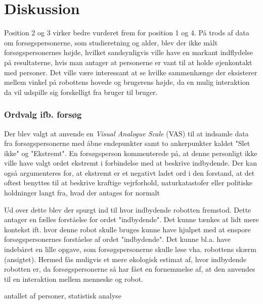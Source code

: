 \section*{Diskussion}
\label{Discussion}

Position 2 og 3 virker bedre vurderet frem for position 1 og 4. På trods af data om forsøgspersonerne, som studieretning og alder, blev der ikke målt forsøgspersonernes højde, hvilket sandsynligvis ville have en markant indflydelse på resultaterne, hvis man antager at personerne er vant til at holde øjenkontakt med personer. Det ville være interessant at se hvilke sammenhænge der eksisterer mellem vinkel på robottens hovede og brugerens højde, da en mulig interaktion da vil udspille sig forskelligt fra bruger til bruger. 

\subsubsection{Ordvalg ifb. forsøg}
Der blev valgt at anvende en \textit{Visual Analogue Scale} (VAS) til at indsamle data fra forsøgspersonerne med åbne endepunkter samt to ankerpunkter kaldet "Slet ikke" og "Ekstremt". En forsøgsperson kommenterede på, at denne personligt ikke ville have valgt ordet ekstremt i forbindelse med at beskrive indbydende. Der kan også argumenteres for, at ekstremt er et negativt ladet ord i den forstand, at det oftest benyttes til at beskrive kraftige vejrforhold, naturkatastofer eller politiske holdninger langt fra, hvad der antages for normalt  %

Ud over dette blev der spurgt ind til hvor indbydende robotten fremstod. Dette antager en fælles forståelse for ordet "indbydende". Det kunne tænkes at lidt mere kontekst ift. hvor denne robot skulle bruges kunne have hjulpet med at enspore forsøgspersonernes forståelse af ordet "indbydende". Det kunne bl.a. have indebåret en lille opgave, som forsøgspersonerne skulle løse vha. robottens skærm (ansigtet). Hermed fås muligvis et mere økologisk estimat af, hvor indbydende robotten er, da forsøgspersonerne så har fået en fornemmelse af, at den anvendes til en interaktion mellem menneske og robot.



antallet af personer, statistisk analyse
